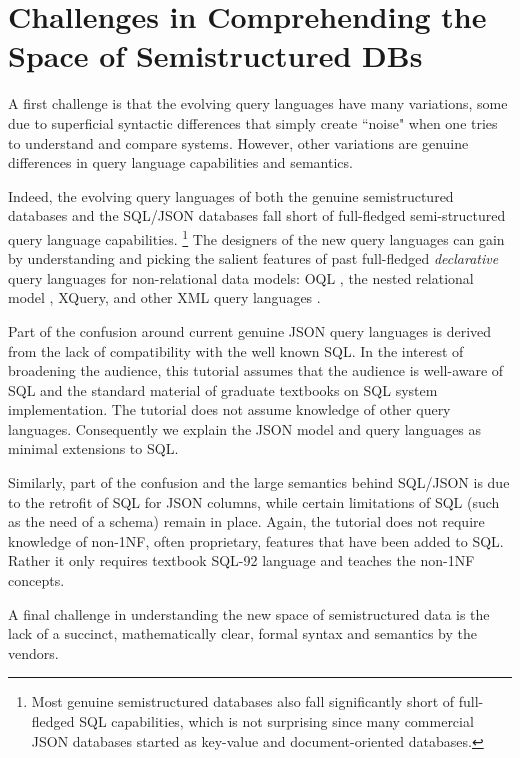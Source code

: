 
\section{Challenges in Comprehending the Space of Semistructured DBs}
A first challenge is that the evolving query languages have many variations, some due to superficial syntactic differences that simply create ``noise" when one tries to understand and compare systems. However, other variations are genuine differences in query language capabilities and semantics.

Indeed, the evolving query languages of both the genuine semistructured databases and the SQL/JSON databases fall short of full-fledged semi-structured query language capabilities.%
\footnote{Most genuine semistructured databases also fall significantly short of full-fledged SQL capabilities, which is not surprising since many commercial JSON databases started as key-value and document-oriented databases.}
The designers of the new query languages can gain by understanding and picking the salient features of past full-fledged \textit{declarative} query languages for non-relational data models: OQL \cite{oql-dbpl-1989}, the nested relational model \cite{nest-unnest-pods-1982,nested-relational-vldb-1988,nested-relational-workshop-lncs-1989}, 
XQuery, and other XML query languages \cite{xquery-3.0-w3c-2013,xml-ql-computer-networks-1999,xml-query-language-survey-sigmod-record-2000}.

Part of the confusion around current genuine JSON query languages is derived from the lack of compatibility with the well known SQL. In the interest of broadening the audience, this tutorial assumes that the audience is well-aware of SQL and the standard material of graduate textbooks on SQL system implementation. The tutorial does not assume knowledge of other query languages. Consequently we explain the JSON model and query languages as minimal extensions to SQL.

Similarly, part of the confusion and the large semantics behind SQL/JSON is due to the retrofit of SQL for JSON columns, while certain limitations of SQL (such as the need of a schema) remain in place. Again, the tutorial does not require knowledge of non-1NF, often proprietary, features that have been added to SQL. Rather it only requires textbook SQL-92 language and teaches the non-1NF concepts.

A final challenge in understanding the new space of semistructured data is the lack of a succinct, mathematically clear, formal syntax and semantics by the vendors. 

